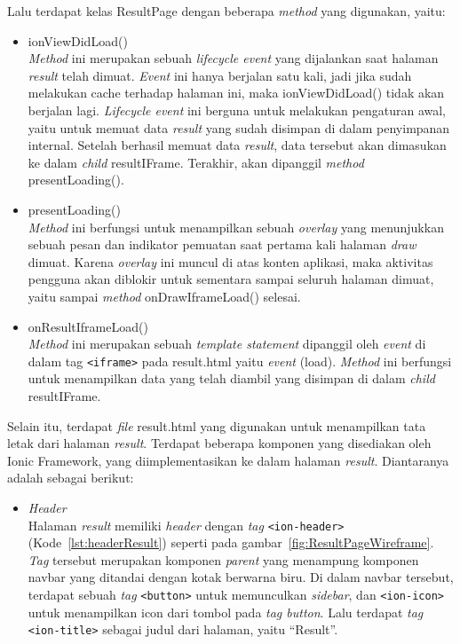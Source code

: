 \begin{enumerate}
	Lalu terdapat kelas ResultPage dengan beberapa \textit{method} yang digunakan, yaitu:
	
	\begin{itemize}
		\item ionViewDidLoad() \\
		\textit{Method} ini merupakan sebuah \textit{lifecycle event} yang dijalankan saat halaman \textit{result} telah dimuat. \textit{Event} ini hanya berjalan satu kali, jadi jika sudah melakukan cache terhadap halaman ini, maka ionViewDidLoad() tidak akan berjalan lagi. \textit{Lifecycle event} ini berguna untuk melakukan pengaturan awal, yaitu untuk memuat data \textit{result} yang sudah disimpan di dalam penyimpanan internal. Setelah berhasil memuat data \textit{result}, data tersebut akan dimasukan ke dalam \textit{child} resultIFrame. Terakhir, akan dipanggil \textit{method} presentLoading().
		\item presentLoading() \\
		\textit{Method} ini berfungsi untuk menampilkan sebuah \textit{overlay} yang menunjukkan sebuah pesan dan indikator pemuatan saat pertama kali halaman \textit{draw} dimuat. Karena \textit{overlay} ini muncul di atas konten aplikasi, maka aktivitas pengguna akan diblokir untuk sementara sampai seluruh halaman dimuat, yaitu sampai \textit{method} onDrawIframeLoad() selesai. 
		\item onResultIframeLoad() \\
		\textit{Method} ini merupakan sebuah \textit{template statement} dipanggil oleh \textit{event} di dalam tag \texttt{<iframe>} pada result.html yaitu \textit{event} (load). \textit{Method} ini berfungsi untuk menampilkan data yang telah diambil yang disimpan di dalam \textit{child} resultIFrame.
	\end{itemize}
	
	Selain itu, terdapat \textit{file} result.html yang digunakan untuk menampilkan tata letak dari halaman \textit{result}. Terdapat beberapa komponen yang disediakan oleh Ionic Framework, yang diimplementasikan ke dalam halaman \textit{result}. Diantaranya adalah sebagai berikut:
	
	\begin{itemize}
		\item \textit{Header} \\
		Halaman \textit{result} memiliki \textit{header} dengan \textit{tag} \texttt{<ion-header>} (Kode~\ref{lst:headerResult}) seperti pada gambar~\ref{fig:ResultPageWireframe}. \textit{Tag} tersebut merupakan komponen \textit{parent} yang menampung komponen navbar yang ditandai dengan kotak berwarna biru. Di dalam navbar tersebut, terdapat sebuah \textit{tag} \texttt{<button>} untuk memunculkan \textit{sidebar}, dan \texttt{<ion-icon>} untuk menampilkan icon dari tombol pada \textit{tag button}. Lalu terdapat \textit{tag} \texttt{<ion-title>} sebagai judul dari halaman, yaitu ``Result''.


\end{itemize}
\end{enumerate}
